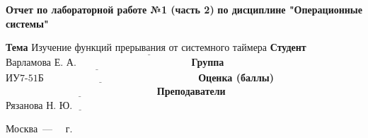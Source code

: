 \begin{titlepage}
	
	\begin{center}
		\noindent\begin{minipage}{1.3\textwidth}\centering
			\Large\textbf{  Отчет по лабораторной работе №1 (часть 2)}\newline
			\textbf{по дисциплине "Операционные системы"}\newline\newline
		\end{minipage}
	\end{center}
	
	\noindent\textbf{Тема} $\underline{\text{Изучение функций прерывания от системного таймера}}$\newline\newline
	\noindent\textbf{Студент} $\underline{\text{Варламова Е. А. ~~~~~~~~~~~~~~~~~~~~~~~~~~~~~~~~~}}$\newline\newline
	\noindent\textbf{Группа} $\underline{\text{ИУ7-51Б~~~~~~~~~~~~~~~~~~~~~~~~~~~~~~~~~~~~~~~~~~~~~~}}$\newline\newline
	\noindent\textbf{Оценка (баллы)} $\underline{\text{~~~~~~~~~~~~~~~~~~~~~~~~~~~~~~~~~~~~~~~~~~~~~}}$\newline\newline
	\noindent\textbf{Преподаватели} $\underline{\text{Рязанова Н. Ю.~~~~~~~~~~~~~~~~~~~~~~~~~}}$\newline\newline\newline
	
	\begin{center}
		\vfill
		Москва~---~\the\year
		~г.
	\end{center}
\end{titlepage}